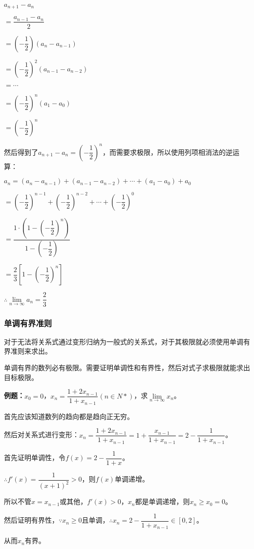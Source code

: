 \documentclass[UTF8, 12pt]{ctexart}
\begin{document}
$a_{n+1}-a_n$

$=\dfrac{a_{n-1}-a_n}{2}$

$=\left(-\dfrac{1}{2}\right)(a_n-a_{n-1})$

$=\left(-\dfrac{1}{2}\right)^2(a_{n-1}-a_{n-2})$

$=\cdots$

$=\left(-\dfrac{1}{2}\right)^n(a_1-a_0)$

$= \left(-\dfrac{1}{2}\right)^n$

然后得到了$a_{n+1}-a_n=\left(-\dfrac{1}{2}\right)^n$，而需要求极限，所以使用列项相消法的逆运算：

$a_n= (a_n-a_{n-1})+(a_{n-1}-a_{n-2})+\cdots+(a_1-a_0)+a_0$\medskip

$= \left(-\dfrac{1}{2}\right)^{n-1} + \left(-\dfrac{1}{2}\right)^{n-2} + \cdots + \left(-\dfrac{1}{2}\right)^0$\medskip

$= \dfrac{1\cdot\left(1-\left(-\dfrac{1}{2}\right)^n\right)}{1-\left(-\dfrac{1}{2}\right)}$\medskip

$= \dfrac{2}{3}\left[1-\left(-\dfrac{1}{2}\right)^n\right]$\medskip

$\therefore\lim\limits_{n\to\infty}a_n=\dfrac{2}{3}$

\subsubsection{单调有界准则}

对于无法将关系式通过变形归纳为一般式的关系式，对于其极限就必须使用单调有界准则来求出。

单调有界的数列必有极限。需要证明单调性和有界性，然后对式子求极限就能求出目标极限。

\textbf{例题：}$x_0=0$，$x_n=\dfrac{1+2x_{n-1}}{1+x_{n-1}}(n\in N*)$，求$\lim\limits_{n\to\infty}x_n$。\medskip

首先应该知道数列的趋向都是趋向正无穷。

然后对关系式进行变形：$x_n=\dfrac{1+2x_{n-1}}{1+x_{n-1}}=1+\dfrac{x_{n-1}}{1+x_{n-1}}=2-\dfrac{1}{1+x_{n-1}}$。

首先证明单调性，令$f(x)=2-\dfrac{1}{1+x}$。

$\therefore f'(x)=\dfrac{1}{(x+1)^2}>0$，则$f(x)$单调递增。

所以不管$x=x_{n-1}$或其他，$f'(x)>0$，$x_n$都是单调递增，则$x_n\geqslant x_0=0$。

然后证明有界性，$\because x_n\geqslant 0$且单调，$\therefore x_n=2-\dfrac{1}{1+x_{n-1}}\in[0,2]$。

从而$x_n$有界。
\end{document}
